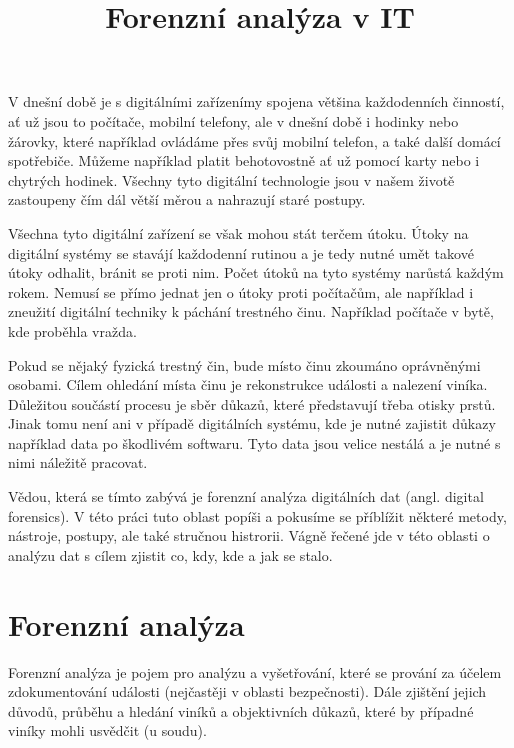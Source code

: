 \documentclass[thesis=B,czech]{FITthesis}[2012/06/26]
\title{Forenzní analýza v IT}
\begin{document}

\begin{introduction}
  \label{sec:uvod}

V dnešní době je s digitálními zařízenímy spojena většina každodenních činností, ať už jsou to počítače, mobilní telefony, ale v dnešní době i hodinky nebo žárovky, které například ovládáme přes svůj mobilní telefon, a také další domácí spotřebiče. Můžeme například platit behotovostně ať už pomocí karty nebo i chytrých hodinek. Všechny tyto digitální technologie jsou v našem životě zastoupeny čím dál větší měrou a nahrazují staré postupy. 

Všechna tyto digitální zařízení se však mohou stát terčem útoku. Útoky na digitální systémy se stavájí každodenní rutinou a je tedy nutné umět takové útoky odhalit, bránit se proti nim. Počet útoků na tyto systémy narůstá každým rokem. Nemusí se přímo jednat jen o útoky proti počítačům, ale například i zneužití digitální techniky k páchání trestného činu. Například počítače v bytě, kde proběhla vražda.

Pokud se nějaký fyzická trestný čin, bude místo činu zkoumáno oprávněnými osobami. Cílem ohledání místa činu je rekonstrukce události a nalezení viníka. Důležitou součástí procesu je sběr důkazů, které představují třeba otisky prstů. Jinak tomu není ani v případě digitálních systému, kde je nutné zajistit důkazy například data po škodlivém softwaru. Tyto data jsou velice nestálá a je nutné s nimi náležitě pracovat.

Vědou, která se tímto zabývá je forenzní analýza digitálních dat (angl. digital forensics). V této práci tuto oblast popíši a pokusíme se příblížit některé metody, nástroje, postupy, ale také stručnou histrorii. Vágně řečené jde v této oblasti o analýzu dat s cílem zjistit co, kdy, kde a jak se stalo.
 

\end{introduction}

\chapter{Forenzní analýza}
Forenzní analýza je pojem pro analýzu a vyšetřování, které se prování za účelem zdokumentování události (nejčastěji v oblasti bezpečnosti). Dále zjištění jejich důvodů, průběhu a hledání viníků a objektivních důkazů, které by případné viníky mohli usvědčit (u soudu)\cite{for_uvod}.
\end{document}
